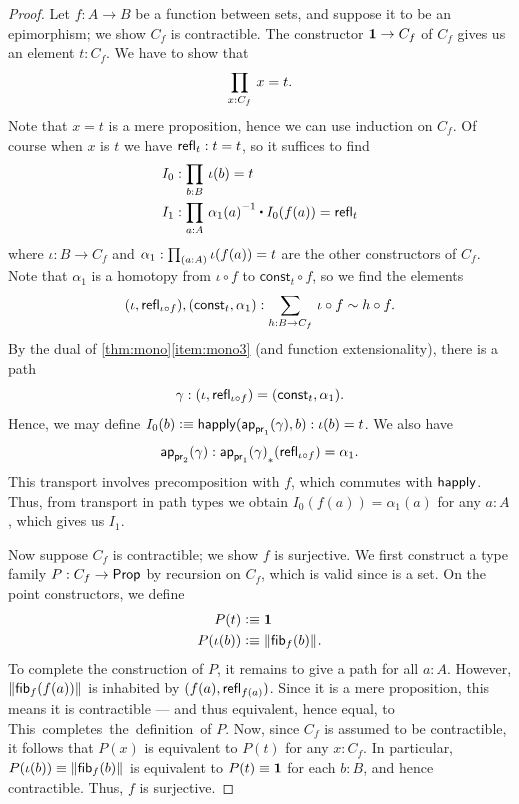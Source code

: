 \begin{proof}
Let $f:A\to B$ be a function between sets, and suppose it to be an epimorphism; we show $C_f$ is contractible.
The constructor $\mathbf{1}\to C_f$ of $C_f$ gives us an element $t:C_f$.
We have to show that
\begin{equation*}
\prd{x:C_f} x= t.
\end{equation*}
Note that $x= t$ is a mere proposition, hence we can use induction on $C_f$.
Of course when $x$ is $t$ we have $\mathsf{refl}_{t}:t=t$, so it suffices to find
\begin{align*}
I_0 & : \prd{b:B} \iota(b)= t\\
I_1 & : \prd{a:A} \opp{\alpha_1(a)} \ct I_0(f(a))=\refl{t}
\end{align*}
where $\iota:B\to C_f$ and $\alpha_1:\prd{a:A} \iota(f(a))= t$ are the other constructors
of $C_f$. Note that $\alpha_1$ is a homotopy from $\iota\circ f$ to
$\mathsf{const}_t\circ f$, so we find the elements
\begin{equation*}
\pairr{\iota,\refl{\iota\circ f}},\pairr{\mathsf{const}_t,\alpha_1}:
\sm{h:B\to C_f} \iota\circ f \htpy h\circ f.
\end{equation*}
By the dual of \cref{thm:mono}\ref{item:mono3} (and function extensionality), there is a path
\begin{equation*}
\gamma:{\mathopen{}(\iota,\mathsf{refl}_{\iota\circ f})\mathclose{}}={\mathopen{}(\mathsf{const}_t,\alpha_1)\mathclose{}}.
\end{equation*}
Hence, we may define $I_0(b)\vcentcolon\equiv \mathsf{happly}(\mathsf{ap}_{\mathsf{pr}_{1}}(\gamma),b):\iota(b)=t$.
We also have
\[\mathsf{ap}_{\mathsf{pr}_{2}}(\gamma) : {\mathsf{ap}_{\mathsf{pr}_{1}}(\gamma)}_{*}\mathopen{}\left({\mathsf{refl}_{\iota\circ f}}\right)\mathclose{} = \alpha_1. \]
This transport involves precomposition with $f$, which commutes with $\mathsf{happly}$.
Thus, from transport in path types we obtain $I_0(f(a)) = \alpha_1(a)$ for any $a:A$, which gives us $I_1$.

Now suppose $C_f$ is contractible; we show $f$ is surjective.
We first construct a type family $P:C_f\to\mathsf{Prop}$ by recursion on $C_f$, which is valid since \prop is a set.
On the point constructors, we define
\begin{align*}
P(t) & \vcentcolon\equiv \mathbf{1}\\
P(\iota(b)) & \vcentcolon\equiv \mathopen{}\left\Vert {\mathsf{fib}}_{f}(b)\right\Vert_{}\mathclose{}.
\end{align*}
To complete the construction of $P$, it remains to give a path
for all $a:A$.
However, $\mathopen{}\left\Vert {\mathsf{fib}}_{f}(f(a))\right\Vert_{}\mathclose{}$ is inhabited by $(f(a),\mathsf{refl}_{f(a)})$.
Since it is a mere proposition, this means it is contractible --- and thus equivalent, hence equal, to \unit.
This completes the definition of $P$.
Now, since $C_f$ is assumed to be contractible, it follows that $P(x)$ is equivalent to $P(t)$ for any $x:C_f$.
In particular, $P(\iota(b))\equiv \mathopen{}\left\Vert {\mathsf{fib}}_{f}(b)\right\Vert_{}\mathclose{}$ is equivalent to $P(t)\equiv \mathbf{1}$ for each $b:B$, and hence contractible.
Thus, $f$ is surjective.


\end{proof}

